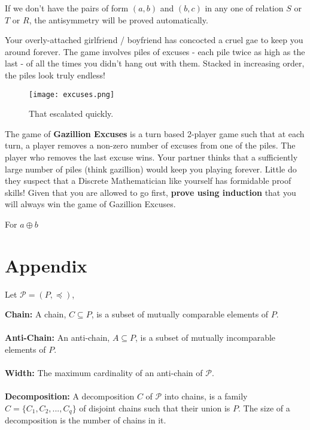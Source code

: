 \documentclass[addpoints]{exam}
\begin{document}
\begin{questions}
\begin{solution}
\begin{parts}
      If we don't have the pairs of form $(a, b)$ and $(b,c)$ in any one of relation $S$ or $T$ or $R$, the antisymmetry will be proved automatically.
     
     \end{parts}
     \end{solution}

\question Your overly-attached girlfriend / boyfriend has concocted a cruel gae to keep you around forever. The game involves piles of excuses - each pile twice as high as the last - of all the times you didn't hang out with them. Stacked in increasing order, the piles look truly endless! 

\begin{figure}[ht]
  \centering
  \texttt{[image: excuses.png]}
  \caption{That escalated quickly.}
  \label{fig:Piles of excuses}
\end{figure}

The game of \textbf{Gazillion Excuses} is a turn based 2-player game such that at each turn, a player removes a non-zero number of excuses from one of the piles. The player who removes the last excuse wins. Your partner thinks that a sufficiently large number of piles (think gazillion) would keep you playing forever. Little do they suspect that a Discrete Mathematician like yourself has formidable proof skills! Given that you are allowed to go first, \textbf{prove using induction} that you will always win the game of Gazillion Excuses. 


\begin{solution}

For 
$a \oplus b$
  \end{solution}



\newpage
\appendix

\section{Appendix}
Let $\mathcal{P}= (P, \preccurlyeq)$,

\textbf{Chain:} A chain, $C\subseteq P$, is a subset of mutually comparable elements of $P$.\\\\
\textbf{Anti-Chain:} An anti-chain, $A \subseteq P$, is a subset of mutually incomparable elements of $P$.\\\\
\textbf{Width:} The maximum cardinality of an anti-chain of $\mathcal{P}$.\\\\
\textbf{Decomposition:} A decomposition $C$ of $\mathcal{P}$ into chains, is a family $C = \{C_1,C_2,...,C_q\}$ of disjoint chains such that their union is $P$. The size of a decomposition is the number of chains in it.










\end{questions}
\end{document}
